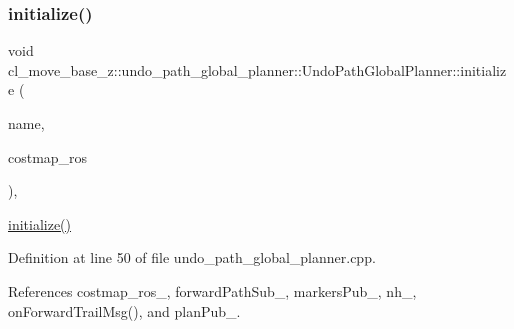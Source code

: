 \mbox{\label{classcl__move__base__z_1_1undo__path__global__planner_1_1UndoPathGlobalPlanner_a69e0fbb98872f108f679b2a6620638f5}} 
\subsubsection{\texorpdfstring{initialize()}{initialize()}}
{\footnotesize\ttfamily void cl\+\_\+move\+\_\+base\+\_\+z\+::undo\+\_\+path\+\_\+global\+\_\+planner\+::\+Undo\+Path\+Global\+Planner\+::initialize (\begin{DoxyParamCaption}\item[{std\+::string}]{name,  }\item[{costmap\+\_\+2d\+::\+Costmap2\+D\+R\+OS $\ast$}]{costmap\+\_\+ros }\end{DoxyParamCaption})\hspace{0.3cm}{\ttfamily [override]}, {\ttfamily [virtual]}}

\hyperlink{classcl__move__base__z_1_1undo__path__global__planner_1_1UndoPathGlobalPlanner_a69e0fbb98872f108f679b2a6620638f5}{initialize()} 

Definition at line 50 of file undo\+\_\+path\+\_\+global\+\_\+planner.\+cpp.



References costmap\+\_\+ros\+\_\+, forward\+Path\+Sub\+\_\+, markers\+Pub\+\_\+, nh\+\_\+, on\+Forward\+Trail\+Msg(), and plan\+Pub\+\_\+.


